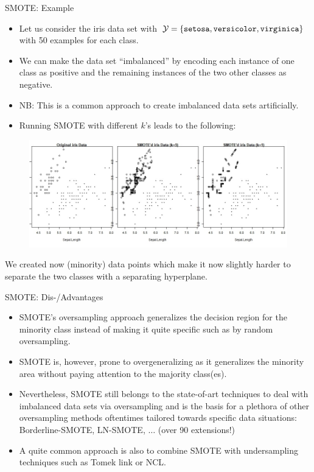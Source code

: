 \documentclass[11pt,compress,t,notes=noshow, xcolor=table]{beamer}
\begin{document}
		
	\begin{frame}{SMOTE: Example}
		\footnotesize
		
		\begin{itemize}
			\item Let us consider the iris data set with $\mathcal{Y}=\{ \texttt{setosa},\texttt{versicolor},\texttt{virginica}  \}$ with 50 examples for each class.
%			
			\item We can make the data set ``imbalanced'' by encoding each instance of one class as positive and the remaining instances of the two other classes as negative.
%			
			\item [] NB: This is a common approach to create imbalanced data sets artificially.
%			
			\item Running SMOTE with different $k$'s leads to the following:
		\end{itemize}		
%		
		\begin{figure}
			\centering
			\includegraphics[width=0.8\linewidth]{figure_man/smoted_iris_data.jpeg}
		\end{figure}
		We created now (minority) data points which make it now slightly harder to separate the two classes with a separating hyperplane.
	\end{frame}


	\begin{frame}{SMOTE: Dis-/Advantages}
		\small
%		
		\begin{itemize}
			\item SMOTE's oversampling approach generalizes the decision region for the minority class instead of making it quite specific such as by random oversampling. 
			\item SMOTE is, however, prone to overgeneralizing as it generalizes the minority area without paying attention to the majority class(es).
			\item Nevertheless, SMOTE still belongs to the state-of-art techniques to deal with imbalanced data sets via oversampling and is the basis for a plethora of other oversampling methods oftentimes tailored towards specific data situations: Borderline-SMOTE, LN-SMOTE, $\ldots$ (over 90 extensions!)
%			
			\item A quite common approach is also to combine SMOTE with undersampling techniques such as Tomek link or NCL.
		\end{itemize}		
	\end{frame}

	\endlecture
\end{document}
